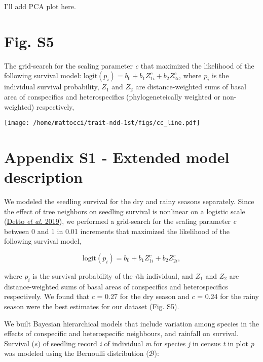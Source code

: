 \documentclass[
  12pt,
  letterpaper,
  DIV=11,
  numbers=noendperiod]{scrartcl}
\begin{document}
I'll add PCA plot here.

\newpage

\hypertarget{fig.-s5}{%
\section{Fig. S5}\label{fig.-s5}}

The grid-search for the scaling parameter \emph{c} that maximized the
likelihood of the following survival model:
\(\mathrm{logit}(p_i) = b_0 + b_1 Z_{1i}^c + b_2 Z_{2i}^c\), where
\(p_i\) is the individual survival probability, \(Z_1\) and \(Z_2\) are
distance-weighted sums of basal area of conspecifics and heterospecifics
(phylogeneteically weighted or non-weighted) respectively,

\texttt{[image: /home/mattocci/trait-ndd-1st/figs/cc\_line.pdf]}

\newpage

\hypertarget{appendix-s1---extended-model-description}{%
\section{Appendix S1 - Extended model
description}\label{appendix-s1---extended-model-description}}

We modeled the seedling survival for the dry and rainy seasons
separately. Since the effect of tree neighbors on seedling survival is
nonlinear on a logistic scale (\protect\hyperlink{ref-Detto2019}{Detto
\emph{et al.} 2019}), we performed a grid-search for the scaling
parameter \emph{c} between 0 and 1 in 0.01 increments that maximized the
likelihood of the following survival model,

\[
\mathrm{logit}(p_i) = b_0 + b_1 Z_{1i}^c + b_2 Z_{2i}^c,
\]

where \(p_i\) is the survival probability of the \emph{i}th individual,
and \(Z_1\) and \(Z_2\) are distance-weighted sums of basal areas of
conspecifics and heterospecifics respectively. We found that \(c\) =
0.27 for the dry season and \(c\) = 0.24 for the rainy season were the
best estimates for our dataset (Fig. S5).

We built Bayesian hierarchical models that include variation among
species in the effects of conspecific and heterospecific neighbours, and
rainfall on survival. Survival (\(s\)) of seedling record \emph{i} of
individual \emph{m} for species \emph{j} in census \emph{t} in plot
\emph{p} was modeled using the Bernoulli distribution (\(\mathcal{B}\)):
\end{document}
